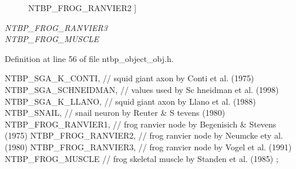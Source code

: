 \begin{Desc}
\begin{description}
{NTBP\_\-FROG\_\-RANVIER2\label{ntbp__object__obj_8h_aeeceaef81d00b84a44823ba078e4fcd3ab0e551ccab8ffdff209d0e122eb860e7}
}]\item[{\em 
NTBP\_\-FROG\_\-RANVIER3\label{ntbp__object__obj_8h_aeeceaef81d00b84a44823ba078e4fcd3a044561c68c787086a371e09dca45fa91}
}]\item[{\em 
NTBP\_\-FROG\_\-MUSCLE\label{ntbp__object__obj_8h_aeeceaef81d00b84a44823ba078e4fcd3aa36513b56d8a9cfb3e48af369ba8dbfe}
}]\end{description}
\end{Desc}



Definition at line 56 of file ntbp\_\-object\_\-obj.h.




\begin{DoxyCode}
                                       {NTBP_SGA_K_CONTI, // squid giant axon by 
      Conti et al. (1975)
                                        NTBP_SGA_SCHNEIDMAN, // values used by Sc
      hneidman et al. (1998)
                                        NTBP_SGA_K_LLANO, // squid giant axon by 
      Llano et al. (1988)
                                        NTBP_SNAIL, // snail neuron by Reuter & S
      tevens (1980)
                                        NTBP_FROG_RANVIER1, // frog ranvier node 
      by Begenisich & Stevens (1975)
                                        NTBP_FROG_RANVIER2, // frog ranvier node 
      by Neumcke ety al. (1980)
                                        NTBP_FROG_RANVIER3, // frog ranvier node 
      by Vogel et al. (1991)
                                        NTBP_FROG_MUSCLE // frog skeletal muscle 
      by Standen et al. (1985)
                                        };
\end{DoxyCode}


